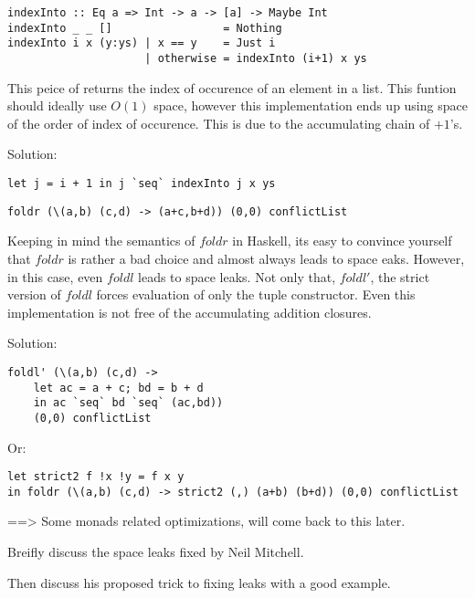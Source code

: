 \begin{lstlisting}
indexInto :: Eq a => Int -> a -> [a] -> Maybe Int
indexInto _ _ []                 = Nothing
indexInto i x (y:ys) | x == y    = Just i
                     | otherwise = indexInto (i+1) x ys
\end{lstlisting}
This peice of returns the index of occurence of an element in a list. This 
funtion should ideally use $O(1)$ space, however this implementation ends up 
using space of the order of index of occurence. This is due to the accumulating
chain of $+1$'s. 

Solution: 
\begin{lstlisting}
let j = i + 1 in j `seq` indexInto j x ys
\end{lstlisting}


\begin{lstlisting}
foldr (\(a,b) (c,d) -> (a+c,b+d)) (0,0) conflictList
\end{lstlisting}
Keeping in mind the semantics of $foldr$ in Haskell, its easy to convince 
yourself that $foldr$ is rather a bad choice and almost always leads to space 
eaks. However, in this case, even $foldl$ leads to space leaks. Not only that, 
$foldl'$, the strict version of $foldl$ forces evaluation of only the tuple 
constructor. Even this implementation is not free of the accumulating addition
closures.

Solution: 
\begin{lstlisting}
foldl' (\(a,b) (c,d) ->
    let ac = a + c; bd = b + d
    in ac `seq` bd `seq` (ac,bd))
    (0,0) conflictList
\end{lstlisting}
Or:
\begin{lstlisting}
let strict2 f !x !y = f x y
in foldr (\(a,b) (c,d) -> strict2 (,) (a+b) (b+d)) (0,0) conflictList
\end{lstlisting}

==> Some monads related optimizations, will come back to this later.




Breifly discuss the space leaks fixed by Neil Mitchell.

Then discuss his proposed trick to fixing leaks with a good example.

